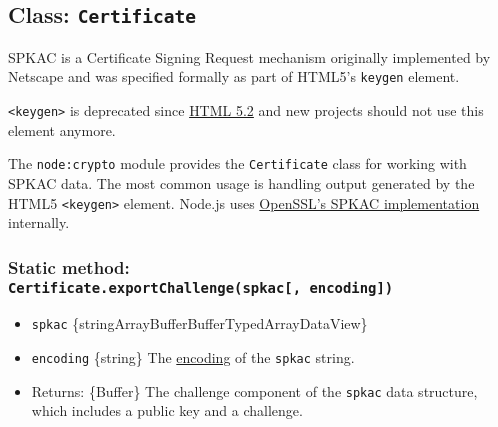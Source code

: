 \subsection{\texorpdfstring{Class:
\texttt{Certificate}}{Class: Certificate}}\label{class-certificate}

SPKAC is a Certificate Signing Request mechanism originally implemented
by Netscape and was specified formally as part of HTML5's
\texttt{keygen} element.

\texttt{\textless{}keygen\textgreater{}} is deprecated since
\href{https://www.w3.org/TR/html52/changes.html\#features-removed}{HTML
5.2} and new projects should not use this element anymore.

The \texttt{node:crypto} module provides the \texttt{Certificate} class
for working with SPKAC data. The most common usage is handling output
generated by the HTML5 \texttt{\textless{}keygen\textgreater{}} element.
Node.js uses
\href{https://www.openssl.org/docs/man3.0/man1/openssl-spkac.html}{OpenSSL's
SPKAC implementation} internally.

\subsubsection{\texorpdfstring{Static method:
\texttt{Certificate.exportChallenge(spkac{[},\ encoding{]})}}{Static method: Certificate.exportChallenge(spkac{[}, encoding{]})}}\label{static-method-certificate.exportchallengespkac-encoding}

\begin{itemize}
\tightlist
\item
  \texttt{spkac}
  \{string\textbar ArrayBuffer\textbar Buffer\textbar TypedArray\textbar DataView\}
\item
  \texttt{encoding} \{string\} The
  \href{buffer.md\#buffers-and-character-encodings}{encoding} of the
  \texttt{spkac} string.
\item
  Returns: \{Buffer\} The challenge component of the \texttt{spkac} data
  structure, which includes a public key and a challenge.
\end{itemize}

\begin{Shaded}
\begin{Highlighting}[]
\OperatorTok{=}  \NormalTok{(}\NormalTok{)}\OperatorTok{;}
\OperatorTok{=} \NormalTok{()}\OperatorTok{;}
\OperatorTok{=}\OperatorTok{;}
\NormalTok{(}\NormalTok{))}\OperatorTok{;}
\end{Highlighting}
\end{Shaded}

